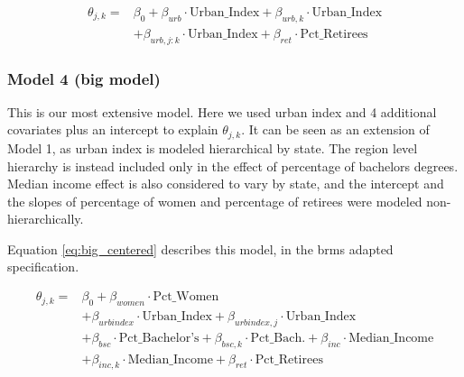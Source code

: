 \documentclass[12pt]{article}
\begin{document}
\begin{equation} \label{eq:nested_centered}
	\begin{aligned}
		\theta_{j,k} =    &\beta_0 + \beta_{urb} \cdot \text{Urban\_Index} + \beta_{urb,k} \cdot \text{Urban\_Index} \\
		&+ \beta_{urb,j:k} \cdot \text{Urban\_Index} + \beta_{ret} \cdot \text{Pct\_Retirees}
	\end{aligned}
\end{equation}



\subsubsection*{Model 4 (big model)}


This is our most extensive model.
Here we used urban index and 4 additional covariates plus an intercept to explain $\theta_{j,k}$.
It can be seen as an extension of Model 1, as urban index is modeled hierarchical by state. The region level hierarchy is instead included only in the effect of percentage of bachelors degrees.
Median income effect is also considered to vary by state, and the intercept and the slopes of percentage of women and percentage of retirees were modeled non-hierarchically.

Equation \ref{eq:big_centered} describes this model, in the brms adapted specification.

\begin{equation} \label{eq:big_centered}
	\begin{aligned}
		\theta_{j,k} = & \beta_0 + \beta_{women} \cdot \text{Pct\_Women}                                                                              \\
		& + \beta_{urbindex} \cdot \text{Urban\_Index} + \beta_{urbindex, j} \cdot \text{Urban\_Index}                                 \\
		& + \beta_{bsc} \cdot \text{Pct\_Bachelor's} + \beta_{bsc,k} \cdot \text{Pct\_Bach.} + \beta_{inc} \cdot \text{Median\_Income} \\
		& + \beta_{inc,k} \cdot \text{Median\_Income} + \beta_{ret} \cdot \text{Pct\_Retirees}
	\end{aligned}
\end{equation}
\end{document}
